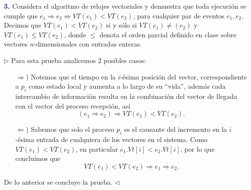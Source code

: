 \newpage
\textbf{\textcolor{MidnightBlue}{3.}}
Considera el algoritmo de relojes vectoriales y demuestra que toda ejecución se cumple
que $e_1\Rightarrow e_2 \Leftrightarrow VT(e_1)<VT(e_2)$, para cualquier par de eventos
$e_1,e_2$. Decimos que $VT(e_1) < VT(e_2)$ si y sólo si $VT(e_1) \neq (e_2)$ y
$VT(e_1)\leq VT(e_2)$, donde $\leq$ denota el orden parcial definido en clase sobre
vectores $n$-dimensionales con entradas enteras.

$\rhd$ Para esta prueba analicemos $2$ posibles casos:
\begin{itemize}
\item[$\Rightarrow$)] Notemos que el tiempo en la $i$-ésima posición
                      del vector, correspondiente a $p_i$ como estado
                      local y aumenta a lo largo de su ``vida'', además
                      cada intercambio de información resulta en la
                      combinación del vector de llegada con el vector
                      del proceso recepción, así
                      \[(e_1\Rightarrow e_2) \Rightarrow VT(e_1) < VT(e_2).\]
\item[$\Leftarrow$)]  Sabemos que solo el proceso $p_i$ es el causante del
                      incremento en la $i$-ésima entrada de cualquiera de los
                      vectores en el sistema. Como $VT(e_1) < VT(e_2)$, en
                      particular $e_1.Vt[i] < e_2.Vt[i]$, por lo que concluimos
                      que
                      \[VT(e_1)<VT(e_2) \Rightarrow e_1\Rightarrow e_2.\]
\end{itemize}
De lo anterior se concluye la prueba.
\hfill $\lhd$
